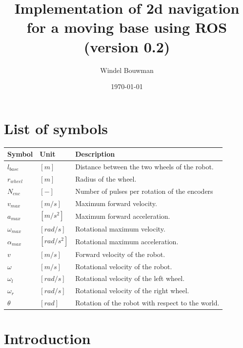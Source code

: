 \documentclass[a4paper]{article}
\begin{document}
\title{Implementation of 2d navigation for a moving base using ROS
(version 0.2)
}
\date{\today}
\author{Windel Bouwman}

\maketitle

\tableofcontents

\section*{List of symbols}

\begin{tabular}{ | l | l | l | }
  \hline                       
  Symbol & Unit & Description \\
  \hline                       
  $l_{base}$ & $[m]$ & Distance between the two wheels of the robot. \\
  \hline                       
  $r_{wheel}$ & $[m]$ & Radius of the wheel. \\
  \hline                       
  $N_{enc}$ & $[-]$ & Number of pulses per rotation of the encoders \\
  \hline                       
  $v_{max}$ & $[m/s]$ & Maximum forward velocity. \\
  \hline                       
  $a_{max}$ & $[m/s^2]$ & Maximum forward acceleration. \\
  \hline                       
  $\omega_{max}$ & $[rad/s]$ & Rotational maximum velocity. \\
  \hline                       
  $\alpha_{max}$ & $[rad/s^2]$ & Rotational maximum acceleration. \\
  \hline                       
  $v$ & $[m/s]$ & Forward velocity of the robot. \\
  \hline                       
  $\omega$ & $[m/s]$ & Rotational velocity of the robot. \\
  \hline                       
  $\omega_l$ & $[rad/s]$ & Rotational velocity of the left wheel. \\
  \hline                       
  $\omega_r$ & $[rad/s]$ & Rotational velocity of the right wheel. \\
  \hline                       
  $\theta$ & $[rad]$ & Rotation of the robot with respect to the world. \\
  \hline                       
\end{tabular}

\section{Introduction}
\end{document}
